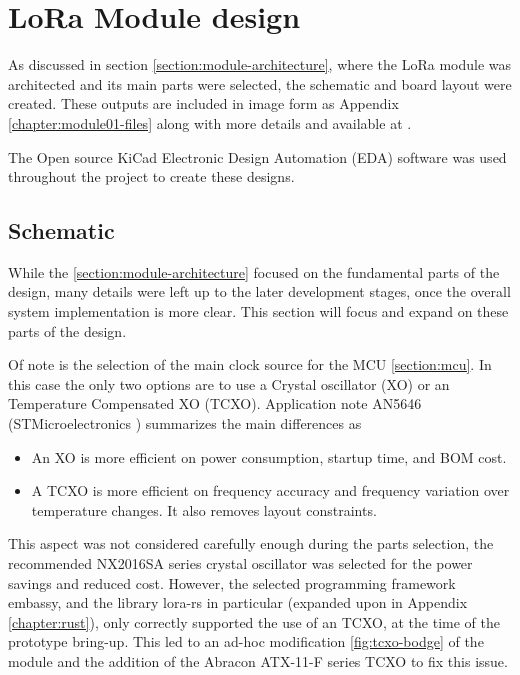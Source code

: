 
\section{LoRa Module design}
As discussed in section \ref{section:module-architecture}, where the LoRa module was architected and its main parts were selected, the schematic and board layout were created. These outputs are included in image form as Appendix \ref{chapter:module01-files} along with more details and available at .

The Open source KiCad Electronic Design Automation (EDA) software was used throughout the project to create these designs.

\subsection{\label{section:module-schematic}Schematic}
While the \ref{section:module-architecture} focused on the fundamental parts of the design, many details were left up to the later development stages, once the overall system implementation is more clear. This section will focus and expand on these parts of the design.

Of note is the selection of the main clock source for the MCU \ref{section:mcu}. In this case the only two options are to use a Crystal oscillator (XO) or an Temperature Compensated XO (TCXO). Application note AN5646 (STMicroelectronics \cite{stmicroelectronics_how_nodate-1}) summarizes the main differences as
\begin{itemize}
    \item An XO is more efficient on power consumption, startup time, and BOM cost.
    \item A TCXO is more efficient on frequency accuracy and frequency variation over temperature changes. It also
    removes layout constraints.
\end{itemize}

This aspect was not considered carefully enough during the parts selection, the recommended NX2016SA series crystal oscillator was selected for the power savings and reduced cost. However, the selected programming framework embassy, and the library lora-rs in particular (expanded upon in Appendix \ref{chapter:rust}), only correctly supported the use of an TCXO, at the time of the prototype bring-up. This led to an ad-hoc modification \ref{fig:tcxo-bodge} of the module and the addition of the Abracon ATX-11-F series TCXO to fix this issue.

